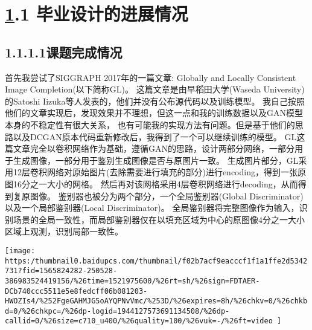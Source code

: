 \documentclass{article}
\begin{document}
\mdhr{}%

\section{\href{https://thumbnail0.baidupcs.com/thumbnail/f02b7acf9eacccf1f1a1ffe2d5342731?fid=1565824282-250528-386983524419156\%26time=1521975600\%26rt=sh\%26sign=FDTAER-DCb740ccc5511e5e8fedcff06b081203-HWOZIs4\%252FgeGAHMJG5oAYQPNvVmc\%253D\%26expires=8h\%26chkv=0\%26chkbd=0\%26chkpc=\%26dp-logid=1944127573691134508\%26dp-callid=0\%26size=c710_u400\%26quality=100\%26vuk=-\%26ft=video}{1}.\hspace*{0.5em}1 毕业设计的进展情况}\label{sec-1-}%

\subsection{1.1.\hspace*{0.5em}1.1课题完成情况}\label{sec-11}%

\noindent{}首先我尝试了SIGGRAPH 2017年的一篇文章: Globally and Locally Consistent Image Completion(以下简称GL)。
这篇文章是由早稻田大学(Waseda University)的Satoshi Iizuka等人发表的，他们并没有公布源代码以及训练模型。
我自己按照他们的文章实现后，发现效果并不理想，但这一点和我的训练数据以及GAN模型本身的不稳定性有很大关系，
也有可能我的实现方法有问题。但是基于他们的思路以及DCGAN原本代码重新修改后，我得到了一个可以继续训练的模型。
GL这篇文章完全以卷积网络作为基础，遵循GAN的思路，设计两部分网络，一部分用于生成图像，一部分用于鉴别生成图像是否与原图片一致。
生成图片部分，GL采用12层卷积网络对原始图片(去除需要进行填充的部分)进行encoding，得到一张原图16分之一大小的网格。
然后再对该网格采用4层卷积网络进行decoding，从而得到复原图像。
鉴别器也被分为两个部分，一个全局鉴别器(Global Discriminator)以及一个局部鉴别器(Local Discriminator)。
全局鉴别器将完整图像作为输入，识别场景的全局一致性，而局部鉴别器仅在以填充区域为中心的原图像4分之一大小区域上观测，识别局部一致性。%

\texttt{[image: https:/thumbnail0.baidupcs.com/thumbnail/f02b7acf9eacccf1f1a1ffe2d5342731?fid=1565824282-250528-386983524419156/\%26time=1521975600/\%26rt=sh/\%26sign=FDTAER-DCb740ccc5511e5e8fedcff06b081203-HWOZIs4/\%252FgeGAHMJG5oAYQPNvVmc/\%253D/\%26expires=8h/\%26chkv=0/\%26chkbd=0/\%26chkpc=/\%26dp-logid=1944127573691134508/\%26dp-callid=0/\%26size=c710\_u400/\%26quality=100/\%26vuk=-/\%26ft=video
]}{}%
\end{document}
